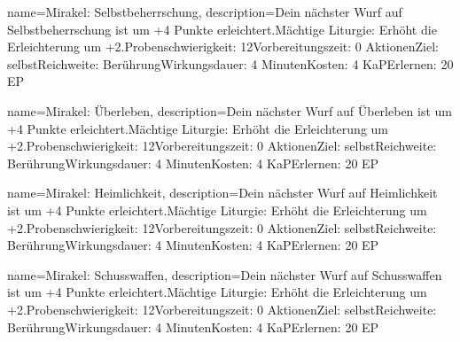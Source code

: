 {
    name={Mirakel: Selbstbeherrschung},
    description={Dein nächster Wurf auf Selbstbeherrschung ist um +4 Punkte erleichtert.\newline Mächtige Liturgie: Erhöht die Erleichterung um +2.\newline Probenschwierigkeit: 12\newline Vorbereitungszeit: 0 Aktionen\newline Ziel: selbst\newline Reichweite: Berührung\newline Wirkungsdauer: 4 Minuten\newline Kosten: 4 KaP\newline Erlernen: 20 EP}
}


{
    name={Mirakel: Überleben},
    description={Dein nächster Wurf auf Überleben ist um +4 Punkte erleichtert.\newline Mächtige Liturgie: Erhöht die Erleichterung um +2.\newline Probenschwierigkeit: 12\newline Vorbereitungszeit: 0 Aktionen\newline Ziel: selbst\newline Reichweite: Berührung\newline Wirkungsdauer: 4 Minuten\newline Kosten: 4 KaP\newline Erlernen: 20 EP}
}


{
    name={Mirakel: Heimlichkeit},
    description={Dein nächster Wurf auf Heimlichkeit ist um +4 Punkte erleichtert.\newline Mächtige Liturgie: Erhöht die Erleichterung um +2.\newline Probenschwierigkeit: 12\newline Vorbereitungszeit: 0 Aktionen\newline Ziel: selbst\newline Reichweite: Berührung\newline Wirkungsdauer: 4 Minuten\newline Kosten: 4 KaP\newline Erlernen: 20 EP}
}


{
    name={Mirakel: Schusswaffen},
    description={Dein nächster Wurf auf Schusswaffen ist um +4 Punkte erleichtert.\newline Mächtige Liturgie: Erhöht die Erleichterung um +2.\newline Probenschwierigkeit: 12\newline Vorbereitungszeit: 0 Aktionen\newline Ziel: selbst\newline Reichweite: Berührung\newline Wirkungsdauer: 4 Minuten\newline Kosten: 4 KaP\newline Erlernen: 20 EP}
}


